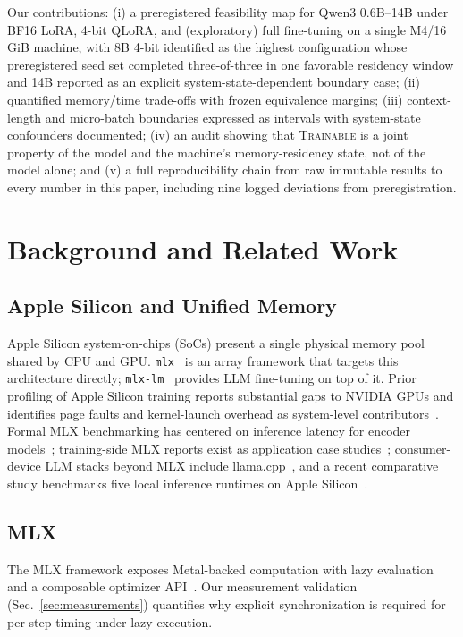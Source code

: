 \documentclass[10pt,twocolumn]{article}
\newcommand{\trainable}{\textsc{Trainable}\xspace}
\begin{document}
Our contributions: (i) a preregistered feasibility map for Qwen3
0.6B--14B under BF16 LoRA, 4-bit QLoRA, and (exploratory) full
fine-tuning on a single M4/16\,GiB machine, with 8B 4-bit identified
as the highest configuration whose preregistered seed set completed
three-of-three in one favorable residency window and 14B reported as an
explicit system-state-dependent boundary case; (ii) quantified
memory/time trade-offs with frozen equivalence margins; (iii)
context-length and micro-batch boundaries expressed as intervals with
system-state confounders documented; (iv) an audit showing that
\trainable is a joint property of the model and the machine's
memory-residency state, not of the model alone; and (v) a full
reproducibility chain from raw immutable results to every number in
this paper, including nine logged deviations from preregistration.

\section{Background and Related Work}
\label{sec:related}
\subsection{Apple Silicon and Unified Memory}
Apple Silicon system-on-chips (SoCs) present a single physical memory pool shared by CPU and GPU.
\texttt{mlx}~\cite{mlx2023} is an array framework that targets this architecture
directly; \texttt{mlx-lm}~\cite{mlxlm} provides LLM fine-tuning on top of it.
Prior profiling of Apple Silicon training reports substantial gaps to NVIDIA
GPUs and identifies page faults and kernel-launch overhead as system-level
contributors~\cite{feng2025profiling}. Formal MLX benchmarking has centered
on inference latency for encoder models~\cite{ajayi2025benchmarking};
training-side MLX reports exist as application case
studies~\cite{baral2026distillation}; consumer-device LLM stacks beyond MLX
include llama.cpp~\cite{llamacpp}, and a recent comparative study benchmarks
five local inference runtimes on Apple Silicon~\cite{rajesh2025production}.

\subsection{MLX}
The MLX framework exposes Metal-backed computation with lazy evaluation and a
composable optimizer API~\cite{mlx2023}. Our measurement validation
(Sec.~\ref{sec:measurements}) quantifies why explicit synchronization is
required for per-step timing under lazy execution.
\end{document}
